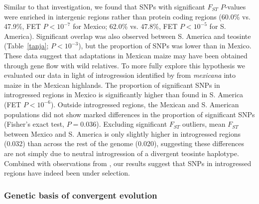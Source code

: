 {{Similar to that investigation, we found that SNPs with significant $F_{ST}$ $P$-values were enriched in intergenic regions rather than protein coding regions (60.0\% vs. 47.9\%, FET $P < 10^{-7}$ for Mexico; 62.0\% vs. 47.8\%, FET $P<10^{-5}$ for S. America). 
Significant overlap was also observed between S. America and teosinte (Table~\ref{tanja}; $P<10^{-3}$), but the proportion of SNPs was lower than in Mexico.
These data suggest that adaptations in Mexican maize may have been obtained through gene flow with wild relatives.  To more fully explore this hypothesis we evaluated our data in light of introgression identified by \citet{Profford_2013} from \textit{mexicana} into maize in the Mexican highlands.  
The proportion of significant SNPs in introgressed regions in Mexico is significantly higher than found in S. America (FET $P<10^{-6}$).
Outside introgressed regions, the Mexican and S. American populations did not show marked differences in the proportion of significant SNPs (Fisher's exact test, $P=0.036$).  Excluding  significant $F_{ST}$ outliers, mean $F_{ST}$ between Mexico and S. America is only slightly higher in introgressed regions (0.032) than across the rest of the genome (0.020), suggesting these differences are not simply due to neutral introgression of a divergent teosinte haplotype.  Combined with observations from \cite{Profford_2013}, our results suggest that SNPs in introgressed regions have indeed been under selection. 


\subsubsection{Genetic basis of convergent evolution}


}}
